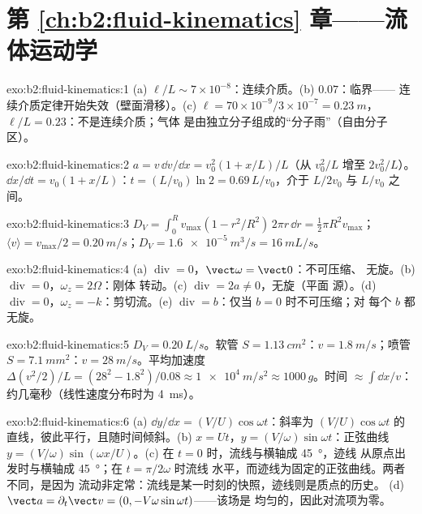 \section*{第 \ref{ch:b2:fluid-kinematics} 章——流体运动学}

\begin{solution}{exo:b2:fluid-kinematics:1}
(a) $\ell/L \sim 7 \times 10^{-8}$：连续介质。(b) $0.07$：临界——
连续介质定律开始失效（壁面滑移）。(c) $\ell = 70 \times 10^{-9}
/3 \times 10^{-7} = \qty{0.23}{m}$，$\ell/L = 0.23$：不是连续介质；气体
是由独立分子组成的“分子雨”（自由分子区）。
\end{solution}

\begin{solution}{exo:b2:fluid-kinematics:2}
$a = v\,\dd v/\dd x = v_0^2(1 + x/L)/L$（从 $v_0^2/L$ 增至 $2v_0^2/L$）。
$\dd x/\dd t = v_0(1 + x/L)$：$t = (L/v_0)\ln2 = 0.69\,L/v_0$，介于
$L/2v_0$ 与 $L/v_0$ 之间。
\end{solution}

\begin{solution}{exo:b2:fluid-kinematics:3}
$D_V = \int_0^Rv_{\max}(1 - r^2/R^2)\,2\pi r\,\dd r = \tfrac12\pi R^2v_{\max}$；
$\langle v\rangle = v_{\max}/2 = \qty{0.20}{m/s}$；$D_V = \qty{1.6e-5}{m^3/s} =
\qty{16}{mL/s}$。
\end{solution}

\begin{solution}{exo:b2:fluid-kinematics:4}
(a) $\operatorname{div} = 0$，$\vect\omega = \vect 0$：不可压缩、
无旋。(b) $\operatorname{div} = 0$，$\omega_z = 2\Omega$：刚体
转动。(c) $\operatorname{div} = 2a \ne 0$，无旋（平面
源）。(d) $\operatorname{div} = 0$，$\omega_z = -k$：剪切流。(e)
$\operatorname{div} = b$：仅当 $b = 0$ 时不可压缩；对
每个 $b$ 都无旋。
\end{solution}

\begin{solution}{exo:b2:fluid-kinematics:5}
$D_V = \qty{0.20}{L/s}$。软管 $S = \qty{1.13}{cm^2}$：$v = \qty{1.8}{m/s}$；喷管
$S = \qty{7.1}{mm^2}$：$v = \qty{28}{m/s}$。平均加速度 $\Delta(v^2/2)/L
= (28^2 - 1.8^2)/0.08 \approx \qty{1e4}{m/s^2} \approx 1000\,g$。时间 $\approx
\int\dd x/v$：约几毫秒（线性速度分布时为 \qty{4}{ms}）。
\end{solution}

\begin{solution}{exo:b2:fluid-kinematics:6}
(a) $\dd y/\dd x = (V/U)\cos\omega t$：斜率为
$(V/U)\cos\omega t$ 的直线，彼此平行，且随时间倾斜。(b) $x = Ut$，$y =
(V/\omega)\sin\omega t$：正弦曲线 $y = (V/\omega)\sin(\omega x/U)$。(c) 在
$t = 0$ 时，流线与横轴成 \qty{45}{\degree}，迹线
从原点出发时与横轴成 \qty{45}{\degree}；在 $t = \pi/2\omega$ 时流线
水平，而迹线为固定的正弦曲线。两者不同，是因为
流动非定常：流线是某一时刻的快照，迹线则是质点的历史。
(d) $\vect a = \partial_t\vect v = (0, -V\omega\sin\omega t)$——该场是
均匀的，因此对流项为零。
\end{solution}

